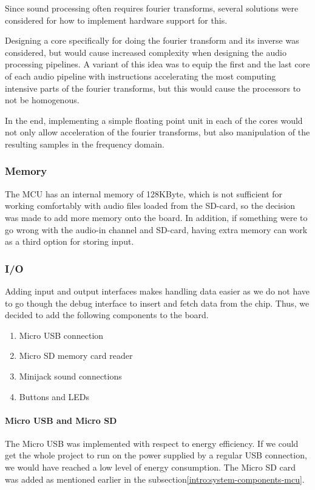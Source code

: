 
Since sound processing often requires fourier transforms, several solutions were
considered for how to implement hardware support for this.

Designing a core specifically for doing the fourier transform and its inverse
was considered, but would cause increased complexity when designing the audio
processing pipelines. A variant of this idea was to equip the first and the last
core of each audio pipeline with instructions accelerating the most computing
intensive parts of the fourier transforms, but this would cause the processors
to not be homogenous.

In the end, implementing a simple floating point unit in each of the cores
would not only allow acceleration of the fourier transforms, but also
manipulation of the resulting samples in the frequency domain.

\subsubsection{Memory}
The MCU has an internal memory of 128KByte, which is not sufficient for working
comfortably with audio files loaded from the SD-card, so the decision was made
to add more memory onto the board. In addition, if something were to go wrong
with the audio-in channel and SD-card, having extra memory can work as a third
option for storing input.

\subsubsection{I/O}
Adding input and output interfaces makes handling data easier as we do not have
to go though the debug interface to insert and fetch data from the chip. Thus,
we decided to add the following components to the board.

\begin{enumerate}
	\item Micro USB connection
	\item Micro SD memory card reader
	\item Minijack sound connections
	\item Buttons and LEDs
\end{enumerate}

\paragraph{Micro USB and Micro SD}
The Micro USB was implemented with respect to energy efficiency. If we could get
the whole project to run on the power supplied by a regular USB connection, we
would have reached a low level of energy consumption. The Micro SD card was
added as mentioned earlier in the subsection\ref{intro:system-components-mcu}.

